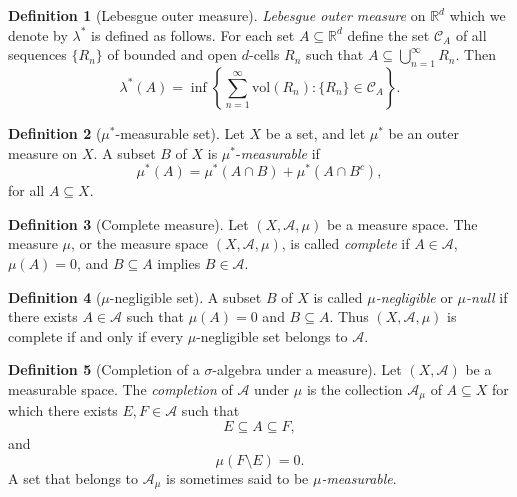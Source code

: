 \documentclass[12pt]{article}
\theoremstyle{definition}
\newtheorem{definition}{Definition}[section]
\newcommand{\real}{\mathbb{R}}   %
\newcommand{\algebra}{\mathscr{A}}
\begin{document}
\begin{definition}[Lebesgue outer measure]
    \textit{Lebesgue outer measure} on $\real^d$ which we denote by $\lambda^*$ is defined as follows. For each set $A\subseteq\real^d$ define the set $\mathscr{C}_A$ of all sequences $\{R_n\}$ of bounded and open $d$-cells $R_n$ such that $A\subseteq \bigcup_{n=1}^\infty R_n$. Then 
    \begin{equation*}
        \lambda^*(A)=\inf \left\{\sum_{n=1}^\infty \text{vol}(R_n):\{R_n\}\in \mathscr{C}_A\right\}.
    \end{equation*}
\end{definition}
\begin{definition}[$\mu^*$-measurable set]
    Let $X$ be a set, and let $\mu^*$ be an outer measure on $X$. A subset $B$ of $X$ is $\mu^*$-\textit{measurable} if 
    \begin{equation*}
        \mu^*(A)=\mu^*(A\cap B)+\mu^*(A\cap B^c),
    \end{equation*}
    for all $A\subseteq X$.
\end{definition}
\begin{definition}[Complete measure]
    Let $(X,\algebra,\mu)$ be a measure space. The measure $\mu$, or the measure space $(X,\algebra,\mu)$, is called \textit{complete} if $A\in\algebra$, $\mu(A)=0$, and $B\subseteq A$ implies $B\in\algebra$.
\end{definition}
\begin{definition}[$\mu$-negligible set]
    A subset $B$ of $X$ is called \textit{$\mu$-negligible} or \textit{$\mu$-null} if there exists $A\in\algebra$ such that $\mu(A)=0$ and $B\subseteq A$. Thus $(X,\algebra,\mu)$ is complete if and only if every $\mu$-negligible set belongs to $\algebra$.
\end{definition}
\begin{definition}[Completion of a $\sigma$-algebra under a measure]
    Let $(X,\algebra)$ be a measurable space. The \textit{completion} of $\algebra$ under $\mu$ is the collection $\algebra_\mu$ of $A\subseteq X$ for which there exists $E,F\in\algebra$ such that
    \begin{equation*}
        E\subseteq A\subseteq F,
    \end{equation*}
    and 
    \begin{equation*}
        \mu(F\setminus E)=0.
    \end{equation*}
    A set that belongs to $\algebra_\mu$ is sometimes said to be \textit{$\mu$-measurable}.
\end{definition}
\end{document}
